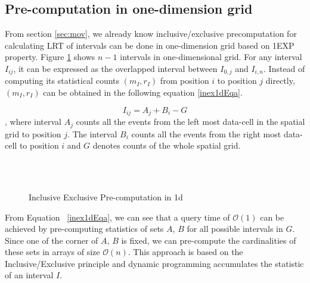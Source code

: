 \documentclass[AMA,LATO1COL]{WileyNJD-v2}
\newcommand\bigo{\mathcal O}
\begin{document}
\subsection{Pre-computation in one-dimension grid}
From section \ref{sec:mov}, we already know inclusive/exclusive precomputation for calculating LRT of intervals can be done in one-dimension grid based on 1EXP property. Figure \ref{inex1dgen} shows $n-1$ intervals in one-dimensional grid. For any interval $I_{ij}$, it can be expressed as the overlapped interval between $I_{0,j}$ and $I_{i,n}$. Instead of computing its statistical counts $(m_I, r_I)$ from position $i$ to position $j$ directly, $(m_I, r_I)$ can be obtained in the following equation \ref{inex1dEqa}.

\begin{equation}\label{inex1dEqa}
I_{ij} = A_j + B_i - G
\end{equation},
where interval $A_j$ counts all the events from the left most data-cell in
the spatial grid to position $j$. The interval $B_i$ counts all the events from the right most
data-cell to position $i$ and $G $ denotes counts of the whole spatial
grid.

\begin{figure}[h]
\centering
{}\\
~~
~~
\caption{ Inclusive Exclusive Pre-computation in 1d \label{inex1dgen}}
\end{figure}

\normalsize From Equation ~\ref{inex1dEqa}, we can see that a query
time of $\bigo(1)$ can be achieved by pre-computing statistics of sets
$A$, $B$ for all possible intervals in $G$. Since one of
the corner of $A$, $B$ is fixed, we can pre-compute the
cardinalities of these sets in arrays of size $\bigo(n)$. This approach is based on the Inclusive/Exclusive principle and dynamic programming accumulates the statistic of an interval $I$.
\end{document}
